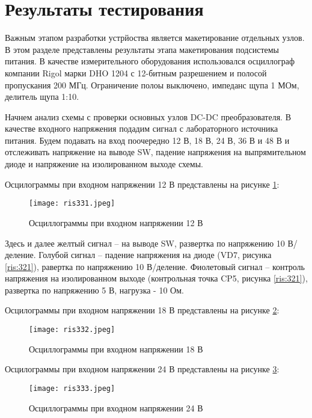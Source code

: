 \section{Результаты тестирования}
\hspace{1cm} 

Важным этапом разработки устрйоства является макетирование отдельных узлов. В этом разделе представлены 
результаты этапа макетирования подсистемы питания. В качестве измерительного оборудования использовался 
осциллограф компании Rigol марки DHO 1204 с 12-битным разрешением и полосой пропускания 200 МГц. Ограничение 
полоы выключено, импеданс щупа 1 МОм, делитель щупа 1:10. 

Начнем анализ схемы с проверки основных узлов DC-DC преобразователя. В качестве входного напряжения подадим
сигнал с лабораторного источника питания. Будем подавать на вход поочередно 12 В, 18 В, 24 В, 36 В и 48 В и 
отслеживать напряжение на выводе SW, падение напряжения на выпрямительном диоде и напряжение на изолированном
выходе схемы. 

Осцилограммы при входном напряжении 12 В представлены на рисунке \ref{ris:331}:

\begin{figure}[H]
    \centering
    \texttt{[image: ris331.jpeg]}
    \caption{Осциллограммы при входном напряжении 12 В}
    \label{ris:331}
\end{figure}

Здесь и далее желтый сигнал -- на выводе SW, развертка по напряжению 10 В/деление. Голубой сигнал -- падение 
напряжения на диоде (VD7, рисунка \ref{ris:321}), равертка по напряжению 10 В/деление. Фиолетовый сигнал -- 
контроль напряжения на изолированном выходе (контрольная точка CP5, рисунка \ref{ris:321}), развертка
по напряжению 5 В, нагрузка - 10 Ом. 

Осцилограммы при входном напряжении 18 В представлены на рисунке \ref{ris:332}:

\begin{figure}[H]
    \centering
    \texttt{[image: ris332.jpeg]}
    \caption{Осциллограммы при входном напряжении 18 В}
    \label{ris:332}
\end{figure}

Осцилограммы при входном напряжении 24 В представлены на рисунке \ref{ris:333}:

\begin{figure}[H]
    \centering
    \texttt{[image: ris333.jpeg]}
    \caption{Осциллограммы при входном напряжении 24 В}
    \label{ris:333}
\end{figure}

